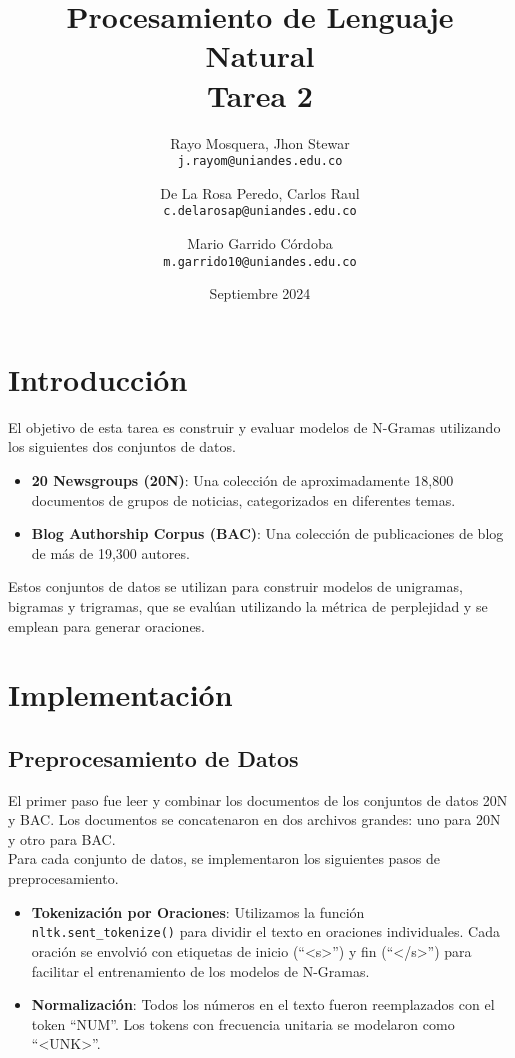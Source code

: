 \documentclass[11pt,english]{article}
\title{Procesamiento de Lenguaje Natural\\
Tarea 2
}
\author{
  Rayo Mosquera, Jhon Stewar\\
  \texttt{j.rayom@uniandes.edu.co}
  \and
  De La Rosa Peredo, Carlos Raul\\
  \texttt{c.delarosap@uniandes.edu.co}\and
  Mario Garrido Córdoba\\
   \texttt{m.garrido10@uniandes.edu.co}
  \\ 
}
\date{Septiembre 2024}
\theoremstyle{plain}
\begin{document}
\maketitle

\section{Introducción}

El objetivo de esta tarea es construir y evaluar modelos de N-Gramas utilizando los siguientes dos conjuntos de datos.

\begin{itemize}
    \item \textbf{20 Newsgroups (20N)}: Una colección de aproximadamente 18,800 documentos de grupos de noticias, categorizados en diferentes temas.
    \item \textbf{Blog Authorship Corpus (BAC)}: Una colección de publicaciones de blog de más de 19,300 autores.
\end{itemize}

\noindent Estos conjuntos de datos se utilizan para construir modelos de unigramas, bigramas y trigramas, que se evalúan utilizando la métrica de perplejidad y se emplean para generar oraciones.

\section{Implementación}

\subsection{Preprocesamiento de Datos}

El primer paso fue leer y combinar los documentos de los conjuntos de datos 20N y BAC. Los documentos se concatenaron en dos archivos grandes: uno para 20N y otro para BAC.\\

\noindent Para cada conjunto de datos, se implementaron los siguientes pasos de preprocesamiento.

\begin{itemize}
    \item \textbf{Tokenización por Oraciones}: Utilizamos la función \texttt{nltk.sent\_tokenize()} para dividir el texto en oraciones individuales. Cada oración se envolvió con etiquetas de inicio (``<s>'') y fin (``</s>'') para facilitar el entrenamiento de los modelos de N-Gramas.
    \item \textbf{Normalización}: Todos los números en el texto fueron reemplazados con el token ``NUM''. Los tokens con frecuencia unitaria se modelaron como ``<UNK>''.
\end{itemize}
\end{document}
